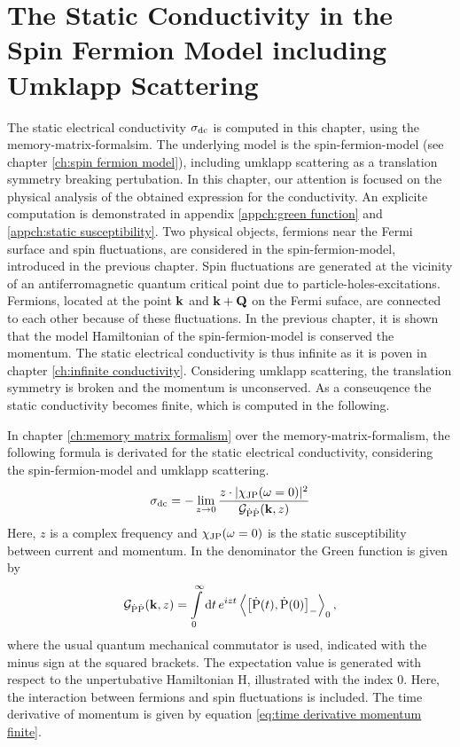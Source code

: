 %
%
%
\chapter{The Static Conductivity in the Spin Fermion Model including Umklapp Scattering}
\label{ch:calculation}
%
%
%
The static electrical conductivity $\sigma_{\mathrm{dc}}$ is computed in this chapter, using the memory-matrix-formalsim.
The underlying model is the spin-fermion-model (see chapter \ref{ch:spin fermion model}), including umklapp scattering as a translation symmetry breaking pertubation.
In this chapter, our attention is focused on the physical analysis of the obtained expression for the conductivity.
An explicite computation is demonstrated in appendix \ref{appch:green function} and \ref{appch:static susceptibility}.
%
%
%
%
Two physical objects, fermions near the Fermi surface and spin fluctuations, are considered in the spin-fermion-model, introduced in the previous chapter.
Spin fluctuations are generated at the vicinity of an antiferromagnetic quantum critical point due to particle-holes-excitations.
Fermions, located at the point $\vb{k}$ and $\vb{k}+\vb{Q}$ on the Fermi suface, are connected to each other because of these fluctuations.
In the previous chapter, it is shown that the model Hamiltonian of the spin-fermion-model is conserved the momentum.
The static electrical conductivity is thus infinite as it is poven in chapter \ref{ch:infinite conductivity}.
Considering umklapp scattering, the translation symmetry is broken and the momentum is unconserved.
As a conseuqence the static conductivity becomes finite, which is computed in the following.

In chapter \ref{ch:memory matrix formalism} over the memory-matrix-formalism, the following formula is derivated for the static electrical conductivity, considering the spin-fermion-model and umklapp scattering.
%
\begin{align}
	\sigma_{\mathrm{dc}} = -\lim\limits_{z \to 0} \frac{z \cdot |\chi_{\mathrm{JP}}(\omega = 0)|^{2}}{\mathcal{G}_{\dot{\mathrm{P}}\dot{\mathrm{P}}}(\vb{k}, z)}
	\label{eq:static conductivity formula}
\end{align}
%
Here, $z$ is a complex frequency and $\chi_{\mathrm{JP}}(\omega = 0)$ is the static susceptibility between current and momentum.
In the denominator the Green function is given by
%
\begin{align}
	\mathcal{G}_{\dot{\mt{P}}\dot{\mt{P}}}(\vb{k}, z) = \int\limits_{0}^{\infty} \dd{t} e^{izt} \expval{\comm{\dot{\mt{P}}(t)}{\dot{\mt{P}}(0)}_{-}}_{0},
	\label{eq:Green function}
\end{align}
%
where the usual quantum mechanical commutator is used, indicated with the minus sign at the squared brackets.
The expectation value is generated with respect to the unpertubative Hamiltonian H, illustrated with the index 0.
Here, the interaction between fermions and spin fluctuations is included.
The time derivative of momentum is given by equation \eqref{eq:time derivative momentum finite}.

